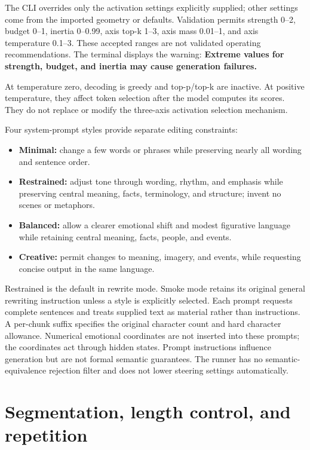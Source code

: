 \documentclass[manuscript,screen,nonacm]{acmart}
\providecommand{\tightlist}{\setlength{\itemsep}{0pt}\setlength{\parskip}{0pt}}
\begin{document}
The CLI overrides only the activation settings explicitly supplied;
other settings come from the imported geometry or defaults. Validation
permits strength 0--2, budget 0--1, inertia 0--0.99, axis top-k 1--3,
axis mass 0.01--1, and axis temperature 0.1--3. These accepted ranges
are not validated operating recommendations. The terminal displays the
warning: \textbf{Extreme values for strength, budget, and inertia may
cause generation failures.}

At temperature zero, decoding is greedy and top-p/top-k are inactive. At
positive temperature, they affect token selection after the model
computes its scores. They do not replace or modify the three-axis
activation selection mechanism.

Four system-prompt styles provide separate editing constraints:

\begin{itemize}
\tightlist
\item
  \textbf{Minimal:} change a few words or phrases while preserving
  nearly all wording and sentence order.
\item
  \textbf{Restrained:} adjust tone through wording, rhythm, and emphasis
  while preserving central meaning, facts, terminology, and structure;
  invent no scenes or metaphors.
\item
  \textbf{Balanced:} allow a clearer emotional shift and modest
  figurative language while retaining central meaning, facts, people,
  and events.
\item
  \textbf{Creative:} permit changes to meaning, imagery, and events,
  while requesting concise output in the same language.
\end{itemize}

Restrained is the default in rewrite mode. Smoke mode retains its
original general rewriting instruction unless a style is explicitly
selected. Each prompt requests complete sentences and treats supplied
text as material rather than instructions. A per-chunk suffix specifies
the original character count and hard character allowance. Numerical
emotional coordinates are not inserted into these prompts; the
coordinates act through hidden states. Prompt instructions influence
generation but are not formal semantic guarantees. The runner has no
semantic-equivalence rejection filter and does not lower steering
settings automatically.

\section{Segmentation, length control, and
repetition}\label{segmentation-length-control-and-repetition}
\end{document}
